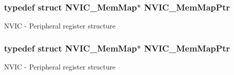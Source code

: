 \subsubsection[{\texorpdfstring{N\+V\+I\+C\+\_\+\+Mem\+Map\+Ptr}{NVIC_MemMapPtr}}]{\setlength{\rightskip}{0pt plus 5cm}typedef struct {\bf N\+V\+I\+C\+\_\+\+Mem\+Map}$\ast$ {\bf N\+V\+I\+C\+\_\+\+Mem\+Map\+Ptr}}\hypertarget{group___n_v_i_c___peripheral_ga685d87c766bb24fb3330aa8cc48fa0e7}{}\label{group___n_v_i_c___peripheral_ga685d87c766bb24fb3330aa8cc48fa0e7}
N\+V\+IC -\/ Peripheral register structure 
\subsubsection[{\texorpdfstring{N\+V\+I\+C\+\_\+\+Mem\+Map\+Ptr}{NVIC_MemMapPtr}}]{\setlength{\rightskip}{0pt plus 5cm}typedef struct {\bf N\+V\+I\+C\+\_\+\+Mem\+Map}$\ast$ {\bf N\+V\+I\+C\+\_\+\+Mem\+Map\+Ptr}}\hypertarget{group___n_v_i_c___peripheral_ga685d87c766bb24fb3330aa8cc48fa0e7}{}\label{group___n_v_i_c___peripheral_ga685d87c766bb24fb3330aa8cc48fa0e7}
N\+V\+IC -\/ Peripheral register structure 